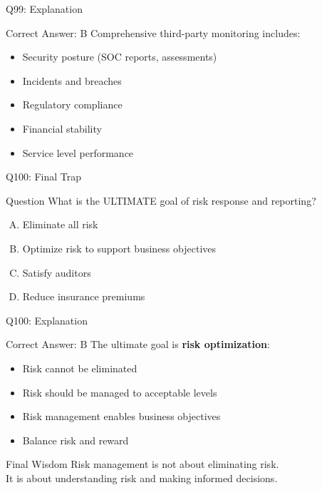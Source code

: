 \documentclass{beamer}
\begin{document}
	\begin{frame}{Q99: Explanation}
		\begin{block}{Correct Answer: B}
			Comprehensive third-party monitoring includes:
			\begin{itemize}
				\item Security posture (SOC reports, assessments)
				\item Incidents and breaches
				\item Regulatory compliance
				\item Financial stability
				\item Service level performance
			\end{itemize}
		\end{block}
	\end{frame}
	
	\begin{frame}{Q100: Final Trap}
		\begin{block}{Question}
			What is the ULTIMATE goal of risk response and reporting?
		\end{block}
		\begin{enumerate}[(A)]
			\item Eliminate all risk
			\item Optimize risk to support business objectives
			\item Satisfy auditors
			\item Reduce insurance premiums
		\end{enumerate}
	\end{frame}
	
	\begin{frame}{Q100: Explanation}
		\begin{block}{Correct Answer: B}
			The ultimate goal is \textbf{risk optimization}:
			\begin{itemize}
				\item Risk cannot be eliminated
				\item Risk should be managed to acceptable levels
				\item Risk management enables business objectives
				\item Balance risk and reward
			\end{itemize}
		\end{block}
		\begin{alertblock}{Final Wisdom}
			Risk management is not about eliminating risk.\\
			It is about understanding risk and making informed decisions.
		\end{alertblock}
	\end{frame}
	
\end{document}
